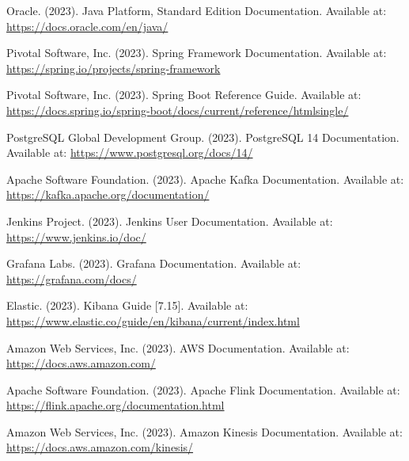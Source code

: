 \documentclass[12pt,a4paper]{report}
\begin{document}
 
\begin{thebibliography}{9}
Oracle. (2023). Java Platform, Standard Edition Documentation. Available at: \url{https://docs.oracle.com/en/java/}

Pivotal Software, Inc. (2023). Spring Framework Documentation. Available at: \url{https://spring.io/projects/spring-framework}

Pivotal Software, Inc. (2023). Spring Boot Reference Guide. Available at: \url{https://docs.spring.io/spring-boot/docs/current/reference/htmlsingle/}

PostgreSQL Global Development Group. (2023). PostgreSQL 14 Documentation. Available at: \url{https://www.postgresql.org/docs/14/}

Apache Software Foundation. (2023). Apache Kafka Documentation. Available at: \url{https://kafka.apache.org/documentation/}

Jenkins Project. (2023). Jenkins User Documentation. Available at: \url{https://www.jenkins.io/doc/}

Grafana Labs. (2023). Grafana Documentation. Available at: \url{https://grafana.com/docs/}

Elastic. (2023). Kibana Guide [7.15]. Available at: \url{https://www.elastic.co/guide/en/kibana/current/index.html}

Amazon Web Services, Inc. (2023). AWS Documentation. Available at: \url{https://docs.aws.amazon.com/}

Apache Software Foundation. (2023). Apache Flink Documentation. Available at: \url{https://flink.apache.org/documentation.html}

Amazon Web Services, Inc. (2023). Amazon Kinesis Documentation. Available at: \url{https://docs.aws.amazon.com/kinesis/}

\end{thebibliography}
\end{document}
